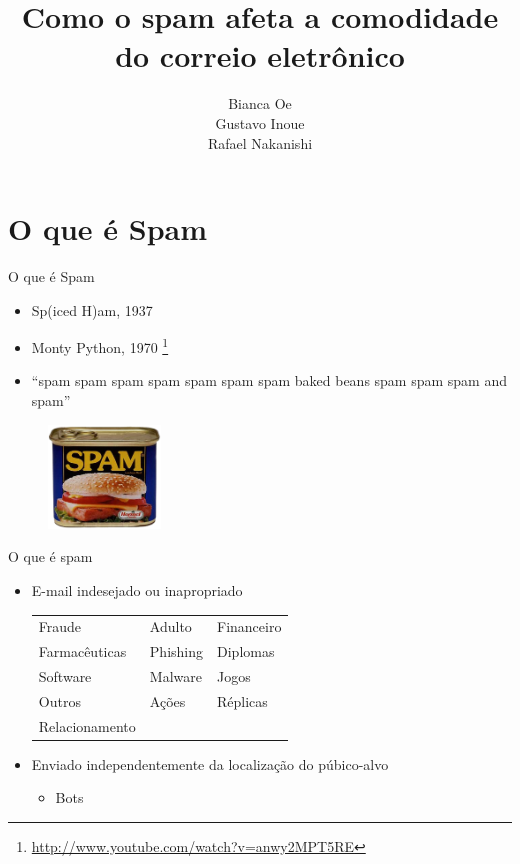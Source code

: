 \documentclass[dvipdfm]{beamer}
\title{Como o spam afeta a comodidade do correio eletrônico}
\author{Bianca Oe\\
		Gustavo Inoue\\
		Rafael Nakanishi}
\institute{Instituto de Ciências Matemáticas e Computação}
\begin{document}
\begin{frame}
	\titlepage
\end{frame}

\begin{frame}
	\begin{scriptsize}
	\end{scriptsize}
\end{frame}

\section{O que é Spam}
\begin{frame}{O que é Spam}
	\begin{itemize}
		\item Sp(iced H)am, 1937
		\item Monty Python, 1970 \footnote{\url{http://www.youtube.com/watch?v=anwy2MPT5RE}}
		\item “spam spam spam spam spam spam spam baked beans  spam spam spam and  spam”
	\end{itemize}

	\begin{figure}[h]
		\centering
		\includegraphics[width=3cm]{Imagens/spam/spam.png}
	\end{figure}
\end{frame}

\begin{frame}{O que é spam}
	\begin{itemize}
		\item E-mail indesejado ou inapropriado
			\begin{table}
			\begin{flushleft}
				\begin{tabular}{p{0.25\textwidth} p{} p{}}
					Fraude & Adulto & Financeiro \\
					Farmacêuticas & Phishing & Diplomas \\
					Software & Malware & Jogos \\
					Outros & Ações & Réplicas \\
					Relacionamento\\
				\end{tabular}
			\end{flushleft}
			\end{table}

		\item Enviado independentemente da localização do púbico-alvo
		\begin{itemize}
			\item Bots
		\end{itemize}
	\end{itemize}
\end{frame}
\end{document}

